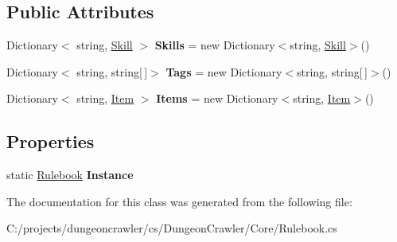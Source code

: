 \subsection*{Public Attributes}
\begin{DoxyCompactItemize}
\item 
\hypertarget{class_dungeon_crawler_1_1_core_1_1_rulebook_afff9e91efa6e6581f7b02b4baeb5e756}{}Dictionary$<$ string, \hyperlink{class_dungeon_crawler_1_1_core_1_1_skill}{Skill} $>$ {\bfseries Skills} = new Dictionary$<$string, \hyperlink{class_dungeon_crawler_1_1_core_1_1_skill}{Skill}$>$()\label{class_dungeon_crawler_1_1_core_1_1_rulebook_afff9e91efa6e6581f7b02b4baeb5e756}

\item 
\hypertarget{class_dungeon_crawler_1_1_core_1_1_rulebook_acd5fb3739084cde354ae4d729354fbe3}{}Dictionary$<$ string, string\mbox{[}$\,$\mbox{]}$>$ {\bfseries Tags} = new Dictionary$<$string, string\mbox{[}$\,$\mbox{]}$>$()\label{class_dungeon_crawler_1_1_core_1_1_rulebook_acd5fb3739084cde354ae4d729354fbe3}

\item 
\hypertarget{class_dungeon_crawler_1_1_core_1_1_rulebook_acd31a8ebfcea393eb1f191fbc22629ed}{}Dictionary$<$ string, \hyperlink{class_dungeon_crawler_1_1_core_1_1_item}{Item} $>$ {\bfseries Items} = new Dictionary$<$string, \hyperlink{class_dungeon_crawler_1_1_core_1_1_item}{Item}$>$()\label{class_dungeon_crawler_1_1_core_1_1_rulebook_acd31a8ebfcea393eb1f191fbc22629ed}

\end{DoxyCompactItemize}
\subsection*{Properties}
\begin{DoxyCompactItemize}
\item 
\hypertarget{class_dungeon_crawler_1_1_core_1_1_rulebook_a113e93268afaa03eb3d7c0ce9ef284e7}{}static \hyperlink{class_dungeon_crawler_1_1_core_1_1_rulebook}{Rulebook} {\bfseries Instance}\label{class_dungeon_crawler_1_1_core_1_1_rulebook_a113e93268afaa03eb3d7c0ce9ef284e7}

\end{DoxyCompactItemize}


The documentation for this class was generated from the following file\+:\begin{DoxyCompactItemize}
\item 
C\+:/projects/dungeoncrawler/cs/\+Dungeon\+Crawler/\+Core/Rulebook.\+cs\end{DoxyCompactItemize}
